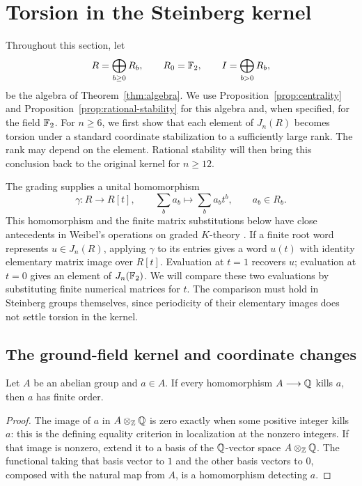 \section{Torsion in the Steinberg kernel}\label{sec:kernel-torsion}

Throughout this section, let
\[
 R=\bigoplus_{b\geq 0}R_b,\qquad R_0=\mathbb F_2,
 \qquad I=\bigoplus_{b>0}R_b,
\]
be the algebra of Theorem~\ref{thm:algebra}.  We use
Proposition~\ref{prop:centrality} and
Proposition~\ref{prop:rational-stability} for this algebra and, when
specified, for the field $\mathbb F_2$. For $n\geq6$, we first show that each
element of $J_n(R)$ becomes torsion under a standard coordinate
stabilization to a sufficiently large rank.
The rank may depend on the element. Rational stability will then bring
this conclusion back to the original kernel for $n\geq12$.

The grading supplies a unital homomorphism
\[
 \gamma:R\longrightarrow R[t],\qquad
 \sum_b a_b\longmapsto\sum_b a_b t^b,
 \qquad a_b\in R_b.
\]
This homomorphism and the finite matrix substitutions below have close
antecedents in Weibel's operations on graded $K$-theory
\cite[Section~1, pp.~468--469]{Weibel1987}.
If a finite root word represents $u\in J_n(R)$, applying $\gamma$
to its entries gives a word $u(t)$ with identity elementary matrix
image over $R[t]$. Evaluation at $t=1$ recovers $u$; evaluation at
$t=0$ gives an element of $J_n(\mathbb F_2)$. We will compare these two
evaluations by substituting finite numerical matrices for $t$. The
comparison must hold in Steinberg groups themselves, since periodicity
of their elementary images does not settle torsion in the kernel.

\subsection{The ground-field kernel and coordinate changes}

\begin{lemma}\label{kt:rational-detection}
Let $A$ be an abelian group and $a\in A$.  If every homomorphism
$A\longrightarrow\mathbb Q$ kills $a$, then $a$ has finite order.
\end{lemma}

\begin{proof}
The image of $a$ in $A\otimes_{\mathbb Z}\mathbb Q$ is zero exactly when some
positive integer kills $a$: this is the defining equality criterion
in localization at the nonzero integers.  If that image is nonzero,
extend it to a basis of the $\mathbb Q$-vector space $A\otimes_{\mathbb Z}\mathbb Q$.
The functional taking that basis vector to $1$ and the other basis
vectors to $0$, composed with the natural map from $A$, is a
homomorphism detecting $a$.
\end{proof}

